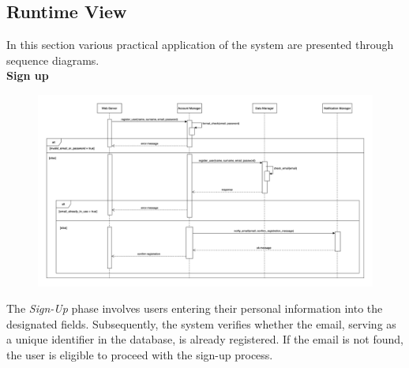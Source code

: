 \documentclass[../DD.tex]{subfiles}
\begin{document}
    \subsection{Runtime View}\label{subsec:runtime_view}
    In this section various practical application of the system are presented through sequence diagrams.\\
    \textbf{Sign up}\\
    \begin{figure}[H]
        \centering
        \hspace*{-3cm}
        \includegraphics[width=1.35\textwidth]{../assets/section_2/SignUp.png}
    \end{figure}
    The \textit{Sign-Up} phase involves users entering their personal information into the designated fields. 
    Subsequently, the system verifies whether the email, serving as a unique identifier in the database, is already registered. 
    If the email is not found, the user is eligible to proceed with the sign-up process.
    \newpage
\end{document}
